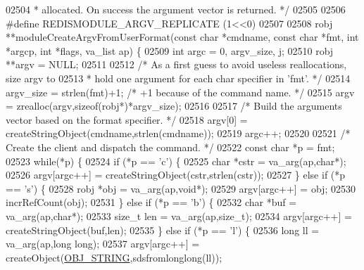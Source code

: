 \begin{DoxyCode}
{{{02504 \textcolor{comment}{ * allocated. On success the argument vector is returned. */}
02505 
02506 \textcolor{preprocessor}{#}\textcolor{preprocessor}{define} \textcolor{preprocessor}{REDISMODULE\_ARGV\_REPLICATE} \textcolor{preprocessor}{(}1\textcolor{preprocessor}{<<}0\textcolor{preprocessor}{)}
02507 
02508 robj **moduleCreateArgvFromUserFormat(\textcolor{keyword}{const} \textcolor{keywordtype}{char} *cmdname, \textcolor{keyword}{const} \textcolor{keywordtype}{char} *fmt, \textcolor{keywordtype}{int} *argcp, \textcolor{keywordtype}{int} *flags, 
      va\_list ap) \{
02509     \textcolor{keywordtype}{int} argc = 0, argv\_size, j;
02510     robj **argv = NULL;
02511 
02512     \textcolor{comment}{/* As a first guess to avoid useless reallocations, size argv to}
02513 \textcolor{comment}{     * hold one argument for each char specifier in 'fmt'. */}
02514     argv\_size = strlen(fmt)+1; \textcolor{comment}{/* +1 because of the command name. */}
02515     argv = zrealloc(argv,\textcolor{keyword}{sizeof}(robj*)*argv\_size);
02516 
02517     \textcolor{comment}{/* Build the arguments vector based on the format specifier. */}
02518     argv[0] = createStringObject(cmdname,strlen(cmdname));
02519     argc++;
02520 
02521     \textcolor{comment}{/* Create the client and dispatch the command. */}
02522     \textcolor{keyword}{const} \textcolor{keywordtype}{char} *p = fmt;
02523     \textcolor{keywordflow}{while}(*p) \{
02524         \textcolor{keywordflow}{if} (*p == \textcolor{stringliteral}{'c'}) \{
02525             \textcolor{keywordtype}{char} *cstr = va\_arg(ap,\textcolor{keywordtype}{char}*);
02526             argv[argc++] = createStringObject(cstr,strlen(cstr));
02527         \} \textcolor{keywordflow}{else} \textcolor{keywordflow}{if} (*p == \textcolor{stringliteral}{'s'}) \{
02528             robj *obj = va\_arg(ap,\textcolor{keywordtype}{void}*);
02529             argv[argc++] = obj;
02530             incrRefCount(obj);
02531         \} \textcolor{keywordflow}{else} \textcolor{keywordflow}{if} (*p == \textcolor{stringliteral}{'b'}) \{
02532             \textcolor{keywordtype}{char} *buf = va\_arg(ap,\textcolor{keywordtype}{char}*);
02533             size\_t len = va\_arg(ap,size\_t);
02534             argv[argc++] = createStringObject(buf,len);
02535         \} \textcolor{keywordflow}{else} \textcolor{keywordflow}{if} (*p == \textcolor{stringliteral}{'l'}) \{
02536             \textcolor{keywordtype}{long} ll = va\_arg(ap,\textcolor{keywordtype}{long} \textcolor{keywordtype}{long});
02537             argv[argc++] = createObject(\hyperlink{server_8h_a65236ea160f69cdef33ec942092af88f}{OBJ\_STRING},sdsfromlonglong(ll));
}}}
\end{DoxyCode}
